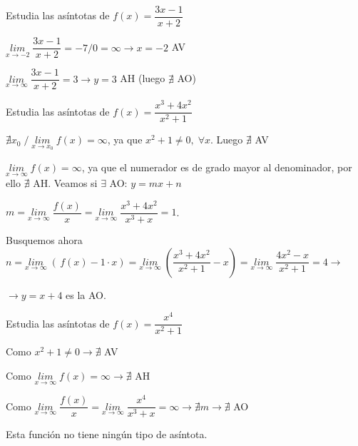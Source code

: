 	\begin{ejre}Estudia las asíntotas de $f(x)=\dfrac {3x-1}{x+2}$
		
	\end{ejre}
	
	\begin{proofw}\renewcommand{\qedsymbol}{$\diamond$}
		
		$\underset {x\to -2}{lim}\;{\dfrac {3x-1}{x+2}}=-7/0=\infty \to x=-2$ AV
		
		$\underset {x\to \infty }{lim}\;{\dfrac {3x-1}{x+2}}=3\to y=3$ AH (luego $\nexists$ AO) 
		
	\end{proofw}

	\begin{ejre} Estudia las asíntotas de $f(x)=\dfrac {x^3+4x^2}{x^2+1}$
		
	\end{ejre}
	
	
	\begin{proofw}\renewcommand{\qedsymbol}{$\diamond$}
	
	$\nexists x_0 \; / \; \underset {x\to x_0}{lim}\;{f(x)}=\infty$, ya que $x^2+1\neq 0, \; \forall x$. Luego $\nexists$ AV
	
	$\underset {x\to \infty}{lim}\;{f(x)}=\infty$, ya que el numerador es de grado mayor al denominador, por ello $\nexists$ AH. Veamos si $\exists$ AO: $y=mx+n$
	
	$m=\underset {x\to \infty}{lim}\;{\dfrac {f(x)}{x}}=\underset {x\to \infty}{lim}\;{\dfrac {x^3+4x^2}{x^3+x}}=1$. 
	
	Busquemos ahora $n=\underset {x\to \infty}{lim}\;{\left(\, f(x)-1\cdot x \right)}=\underset {x\to \infty}{lim}\;{ \left( \dfrac {x^3+4x^2}{x^2+1}-x \right) }=\underset {x\to \infty}{lim}\;{\dfrac {4x^2-x}{x^2+1}=4}\to $ 
	
	$\to y=x+4$ es la AO.
		
	\end{proofw}
	
	\begin{ejre} Estudia las asíntotas de $f(x)=\dfrac {x^4}{x^2+1}$
		
	\end{ejre}
	
	\begin{proofw}\renewcommand{\qedsymbol}{$\diamond$}
	
	Como $x^2+1\neq 0 \to \nexists$ AV
	
	Como $\underset {x\to \infty}{lim}\;{f(x)}=\infty \to \nexists $ AH
	
	Como $\underset {x\to \infty}{lim}\;{\dfrac {f(x)}{x}}=\underset {x\to \infty}{lim}\;{\dfrac {x^4}{x^3+x}}=\infty \to \nexists m \to \nexists $ AO
	
	Esta función no tiene ningún tipo de asíntota.
	
	\end{proofw}
	
